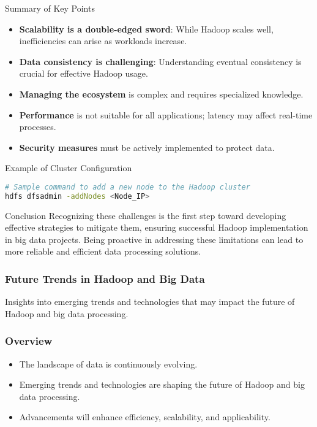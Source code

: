 \documentclass[aspectratio=169]{beamer}
\begin{document}
\begin{frame}[fragile]{Summary of Key Points}
    \begin{itemize}
        \item \textbf{Scalability is a double-edged sword}: While Hadoop scales well, inefficiencies can arise as workloads increase.
        \item \textbf{Data consistency is challenging}: Understanding eventual consistency is crucial for effective Hadoop usage.
        \item \textbf{Managing the ecosystem} is complex and requires specialized knowledge.
        \item \textbf{Performance} is not suitable for all applications; latency may affect real-time processes.
        \item \textbf{Security measures} must be actively implemented to protect data.
    \end{itemize}
\end{frame}

\begin{frame}[fragile]{Example of Cluster Configuration}
    \begin{lstlisting}[language=bash]
# Sample command to add a new node to the Hadoop cluster
hdfs dfsadmin -addNodes <Node_IP>
    \end{lstlisting}
\end{frame}

\begin{frame}[fragile]{Conclusion}
    Recognizing these challenges is the first step toward developing effective strategies to mitigate them, ensuring successful Hadoop implementation in big data projects. Being proactive in addressing these limitations can lead to more reliable and efficient data processing solutions.
\end{frame}

\begin{frame}[fragile]
    \frametitle{Future Trends in Hadoop and Big Data}
    Insights into emerging trends and technologies that may impact the future of Hadoop and big data processing.
\end{frame}

\begin{frame}[fragile]
    \frametitle{Overview}
    \begin{itemize}
        \item The landscape of data is continuously evolving.
        \item Emerging trends and technologies are shaping the future of Hadoop and big data processing.
        \item Advancements will enhance efficiency, scalability, and applicability.
    \end{itemize}
\end{frame}
\end{document}
